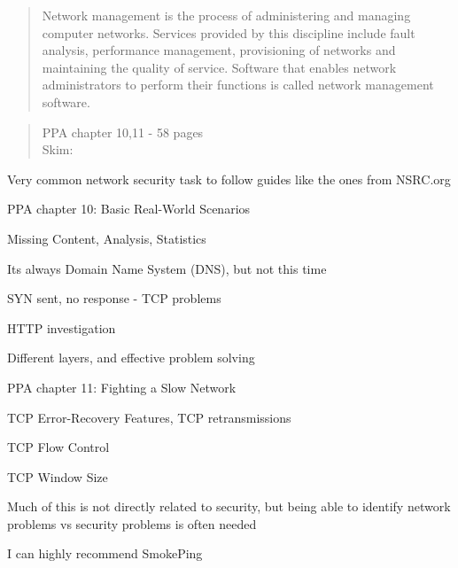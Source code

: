 \documentclass[Screen16to9,17pt]{foils}
\begin{document}

\begin{quote}
Network management is the process of administering and managing computer networks. Services provided by this discipline include fault analysis, performance management, provisioning of networks and maintaining the quality of service. Software that enables network administrators to perform their functions is called network management software.\\
\end{quote}

\begin{quote}
PPA chapter 10,11 - 58 pages\\
Skim:\\
\end{quote}

Very common network security task to follow guides like the ones from NSRC.org



\begin{alltt}\footnotesize

\end{alltt}

\begin{list1}
\item PPA chapter 10: Basic Real-World Scenarios
\begin{list2}
\item Missing Content, Analysis, Statistics
\item Its always Domain Name System (DNS), but not this time
\item SYN sent, no response - TCP problems
\item HTTP investigation
\end{list2}
\item Different layers, and effective problem solving
\end{list1}




\begin{alltt}\footnotesize

\end{alltt}

\begin{list1}
\item PPA chapter 11: Fighting a Slow Network
\begin{list2}
\item TCP Error-Recovery Features, TCP retransmissions
\item TCP Flow Control
\item TCP Window Size
\end{list2}
\item Much of this is not directly related to security, but being able to identify network problems vs security problems is often needed
\item I can highly recommend SmokePing 
\end{list1}
\end{document}

